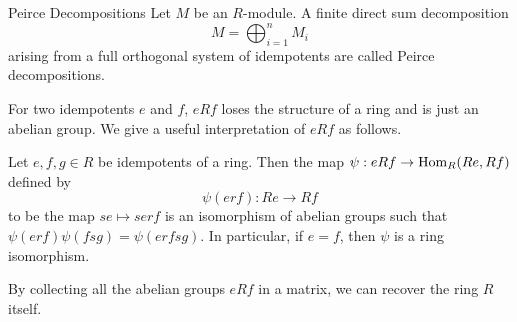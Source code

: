 \documentclass[a4paper]{article}
\begin{document}
\begin{defn}{Peirce Decompositions}{} Let $M$ be an $R$-module. A finite direct sum decomposition $$M=\bigoplus_{i=1}^nM_i$$ arising from a full orthogonal system of idempotents are called Peirce decompositions. 
\end{defn}

For two idempotents $e$ and $f$, $eRf$ loses the structure of a ring and is just an abelian group. We give a useful interpretation of $eRf$ as follows. 

\begin{prp}{}{} Let $e,f,g\in R$ be idempotents of a ring. Then the map $\psi:eRf\to\operatorname{Hom}_R(Re,Rf)$ defined by $$\psi(erf):Re\to Rf$$ to be the map $se\mapsto serf$ is an isomorphism of abelian groups such that $\psi(erf)\psi(fsg)=\psi(erfsg)$. In particular, if $e=f$, then $\psi$ is a ring isomorphism. 
\end{prp}

By collecting all the abelian groups $eRf$ in a matrix, we can recover the ring $R$ itself. 
\end{document}
